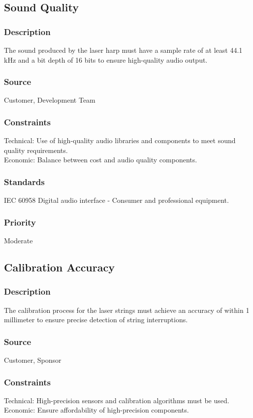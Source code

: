 \subsection{Sound Quality}
\subsubsection{Description}
The sound produced by the laser harp must have a sample rate of at least 44.1 kHz and a bit depth of 16 bits to ensure high-quality audio output.
\subsubsection{Source}
Customer, Development Team
\subsubsection{Constraints}
Technical: Use of high-quality audio libraries and components to meet sound quality requirements.\\
Economic: Balance between cost and audio quality components.
\subsubsection{Standards}
IEC 60958 Digital audio interface - Consumer and professional equipment.
\subsubsection{Priority}
Moderate


\subsection{Calibration Accuracy}
\subsubsection{Description}
The calibration process for the laser strings must achieve an accuracy of within 1 millimeter to ensure precise detection of string interruptions.
\subsubsection{Source}
Customer, Sponsor
\subsubsection{Constraints}
Technical: High-precision sensors and calibration algorithms must be used.\\
Economic: Ensure affordability of high-precision components.
